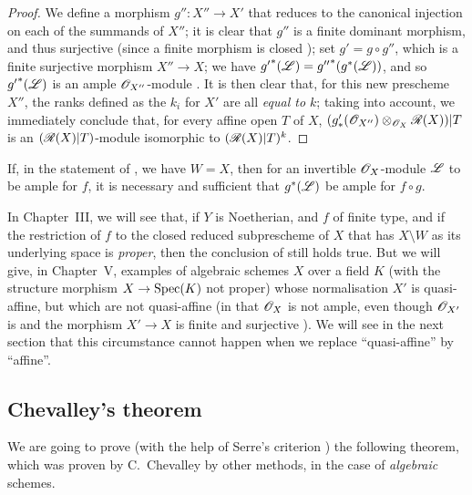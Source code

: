 \begin{proof}
We define a morphism $g'':X''\to X'$ that reduces to the canonical injection on each of the summands of $X''$;
it is clear that $g''$ is a finite dominant morphism, and thus surjective (since a finite morphism is closed );
set $g'=g\circ g''$, which is a finite surjective morphism $X''\to X$;
we have ${g'}^*(\mathscr{L})={g''}^*(g^*(\mathscr{L}))$, and so ${g'}^*(\mathscr{L})$ is an ample $\mathscr{O}_{X''}$-module .
It is then clear that, for this new prescheme $X''$, the ranks defined as the $k_i$ for $X'$ are all \emph{equal to $k$};
taking  into account, we immediately conclude that, for every affine open $T$ of $X$, $(g'_*(\mathscr{O}_{X''})\otimes_{\mathscr{O}_X}\mathscr{R}(X))|T$ is an $(\mathscr{R}(X)|T)$-module isomorphic to $(\mathscr{R}(X)|T)^k$.
\end{proof}

\begin{corollary}[6.6.12]
\label{II.6.6.12}
If, in the statement of , we have $W=X$, then for an invertible $\mathscr{O}_X$-module $\mathscr{L}$ to be ample for $f$, it is necessary and sufficient that $g^*(\mathscr{L})$ be ample for $f\circ g$.
\end{corollary}

\begin{remark}[6.6.13]
\label{II.6.6.13}
In Chapter~III, we will see that, if $Y$ is Noetherian, and $f$ of finite type, and if the restriction of $f$ to the closed reduced subprescheme of $X$ that has $X\setminus W$ as its underlying space is \emph{proper}, then the conclusion of  still holds true.
But we will give, in Chapter~V, examples of algebraic schemes $X$ over a field $K$ (with the structure morphism $X\to\Spec(K)$ not proper) whose normalisation $X'$ is quasi-affine, but which are not quasi-affine (in that $\mathscr{O}_X$ is not ample, even though $\mathscr{O}_{X'}$ is  and the morphism $X'\to X$ is finite and surjective ).
We will see in the next section that this circumstance cannot happen when we replace ``quasi-affine'' by ``affine''.
\end{remark}


\subsection{Chevalley's theorem}
\label{subsection:II.6.7}

We are going to prove (with the help of Serre's criterion ) the following theorem, which was proven by C.~Chevalley by other methods, in the case of \emph{algebraic} schemes.

